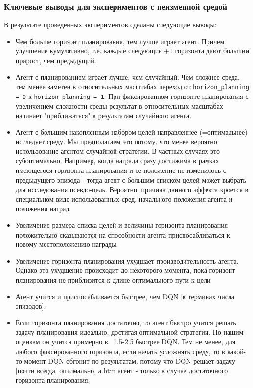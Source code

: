 \documentclass[a4paper]{article}
\begin{document}
\subsubsection{Ключевые выводы для экспериментов с неизменной средой}

В результате проведенных экспериментов сделаны следующие выводы:

\begin{itemize}
  \item Чем больше горизонт планирования, тем лучше играет агент. Причем улучшение кумулятивно, т.е. каждые следующие +1 горизонта дают больший прирост, чем предыдущий.

  \item Агент с планированием играет лучше, чем случайный. Чем сложнее среда, тем менее заметен в относительных масштабах переход от \verb|horizon_planning = 0| к \verb|horizon_planning = 1|. При фиксированном горизонте планирования с увеличением сложности среды результат в относительных масштабах начинает "приближаться" к результатам случайного агента.

  \item Агент с большим накопленным набором целей направленнее (=оптимальнее) исследует среду. Мы предполагаем это потому, что менее вероятно использование агентом случайной стратегии. В частных случаях это субоптимально. Например, когда награда сразу достижима в рамках имеющегося горизонта планирования и ее положение не изменилось с предыдущего эпизода - тогда агент с большим списком целей может выбрать для исследования псевдо-цель. Вероятно, причина данного эффекта кроется в специальном виде использованных сред, начального положения агента и положения наград.

  \item Увеличение размера списка целей и величины горизонта планирования положительно сказываются на способности агента приспосабливаться к новому местоположению награды.

  \item Увеличение горизонта планирования ухудшает производительность агента. Однако это ухудшение происходит до некоторого момента, пока горизонт планирования не приблизится к длине оптимального пути к цели
  \item Агент учится и приспосабливается быстрее, чем DQN [в терминах числа эпизодов].

  \item Если горизонта планирования достаточно, то агент быстро учится решать задачу планирования идеально, достигая оптимальной стратегии. По нашим оценкам он учится примерно в ~1.5-2.5 быстрее DQN. Тем не менее, для любого фиксированного горизонта, если начать усложнять среду, то в какой-то момент DQN обгонит по результатам, потому что DQN решает задачу [почти всегда] оптимально, а htm агент - только в случае достаточного горизонта планирования.


\end{itemize}
\end{document}
